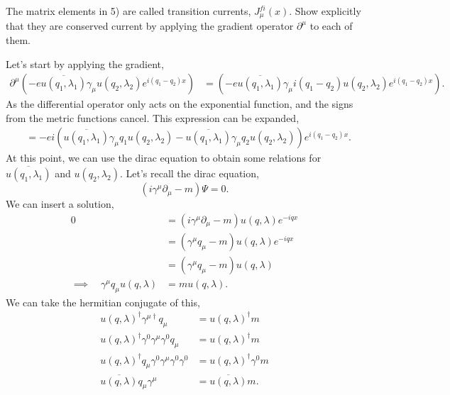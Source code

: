 \documentclass[working, oneside]{../../../Preambles/tuftebook}
\begin{document}
\begin{exercise}[6]
The matrix elements in 5) are called transition currents, \( J_\mu^{fi}(x) \). Show explicitly that they are conserved current by applying the gradient operator \( \partial^\mu \) to each of them.
\end{exercise}
Let's start by applying the gradient,
\begin{align*}
    \partial^{\mu }\left(   -e \overline{u\left( q_1, \lambda_1 \right) }\gamma_{\mu } u\left( q_2, \lambda_2 \right) e^{i\left( q_1-q_2 \right) x} \right) &=
    \left(   -e \overline{u\left( q_1, \lambda_1 \right) }\gamma_{\mu } i\left(q_1 - q_2  \right)  u\left( q_2, \lambda_2 \right) e^{i\left( q_1-q_2 \right) x} \right) 
.\end{align*}
As the differential operator only acts on the exponential function, and the signs from the metric functions cancel. This expression can be expanded,
\begin{align*}
    &=    -ei \left(\overline{u\left( q_1, \lambda_1 \right) }\gamma_{\mu }q_1 u\left( q_2, \lambda_2 \right) - \overline{u\left( q_1, \lambda_1 \right) }\gamma_{\mu }q_2 u\left( q_2, \lambda_2 \right)\right)e^{i\left( q_1-q_2 \right) x}
.\end{align*}
At this point, we can use the dirac equation to obtain some relations for $\overline{u\left( q_1, \lambda_1 \right)} $ and $u\left( q_2, \lambda_2 \right) $. Let's recall the dirac equation,
\[
\left( i \gamma^{\mu } \partial_{\mu } - m  \right)\Psi = 0 
.\] 
We can insert a solution,
\begin{align*}
0 &=  \left( i \gamma^{\mu } \partial_{\mu } - m  \right)u\left( q, \lambda \right) e^{-iqx} \\
 &=  \left( \gamma^{\mu } q_{\mu } - m  \right)u\left( q, \lambda \right) e^{-iqx}\\
 &=  \left( \gamma^{\mu } q_{\mu } - m  \right)u\left( q, \lambda \right) \\
\implies \quad \gamma^{\mu }q_{\mu } u\left( q, \lambda \right) &= m u\left( q, \lambda \right) 
.\end{align*}
We can take the hermitian conjugate of this,
\begin{align*}
    u\left( q, \lambda \right)^{\dagger} \gamma^{\mu \dagger}q_{\mu } &= u\left( q,\lambda \right) ^{\dagger}m \\
    u\left( q, \lambda \right)^{\dagger} \gamma^{0}\gamma^{\mu}\gamma^{0}q_{\mu } &= u\left( q,\lambda \right) ^{\dagger}m \\
    u\left( q, \lambda \right)^{\dagger}q_{\mu } \gamma^{0}\gamma^{\mu}\gamma^{0}\gamma^{0} &= u\left( q,\lambda \right) ^{\dagger}\gamma^{0}m\\
    \overline{u\left( q, \lambda \right)}q_{\mu } \gamma^{\mu} &= \overline{u\left( q,\lambda \right)}m
.\end{align*}
\end{document}
